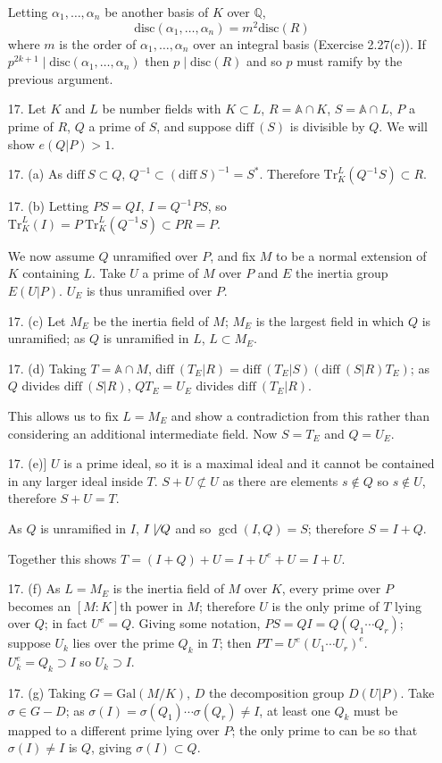 \documentclass{article}
\newcommand{\Q}[0]{\mathbb{Q}}
\newcommand{\diff}[1]{\text{diff}\ #1}
\newcommand{\disc}[1]{\text{disc}(#1)}
\newcommand{\gal}[2]{\text{Gal}(#1 / #2)}
\newcommand{\ringofintegers}[1]{\mathbb{A} \cap #1}
\begin{document}
\begin{enumerate}
Letting $\alpha_1, \ldots, \alpha_n$ be another basis of $K$ over $\Q$, \[ \disc{\alpha_1,\ldots,\alpha_n} = m^2 \disc{R} \] where $m$ is the order of $\alpha_1,\ldots,\alpha_n$ over an integral basis (Exercise 2.27(c)).  If $p^{2k + 1} \mid \disc{\alpha_1,\ldots,\alpha_n}$ then $p \mid \disc{R}$ and so $p$ must ramify by the previous argument.

\item [17.] Let $K$ and $L$ be number fields with $K \subset L$, $R = \ringofintegers{K}$, $S = \ringofintegers{L}$, $P$ a prime of $R$, $Q$ a prime of $S$, and suppose $\diff(S)$ is divisible by $Q$.  We will show $e(Q|P) > 1$.

\item [17. (a)] As $\diff{S} \subset Q$, $Q^{-1} \subset (\diff{S})^{-1} = S^{*}$.  Therefore $\text{Tr}^{L}_{K}(Q^{-1}S) \subset R$.
\item [17. (b)] Letting $PS = QI$, $I = Q^{-1}PS$, so $\text{Tr}^{L}_{K}(I) = P\ \text{Tr}^{L}_{K}(Q^{-1}S) \subset PR = P$.

We now assume $Q$ unramified over $P$, and fix $M$ to be a normal extension of $K$ containing $L$.  Take $U$ a prime of $M$ over $P$ and $E$ the inertia group $E(U|P)$.  $U_{E}$ is thus unramified over $P$.

\item [17. (c)] Let $M_{E}$ be the inertia field of $M$; $M_{E}$ is the largest field in which $Q$ is unramified; as $Q$ is unramified in $L$, $L \subset M_{E}$.
\item [17. (d)] Taking $T = \ringofintegers{M}$, $\diff(T_E|R) = \diff(T_E|S)(\diff(S|R)T_{E})$; as $Q$ divides $\diff(S|R)$, $QT_{E} = U_{E}$ divides $\diff(T_E|R)$.

This allows us to fix $L = M_{E}$ and show a contradiction from this rather than considering an additional intermediate field.  Now $S = T_{E}$ and $Q = U_{E}$.

\item [17.] (e)] $U$ is a prime ideal, so it is a maximal ideal and it cannot be contained in any larger ideal inside $T$.  $S + U \not\subset U$ as there are elements $s \not\in Q$ so $s \not\in U$, therefore $S + U = T$.

As $Q$ is unramified in $I$, $I \not\mid Q$ and so $\gcd(I, Q) = S$; therefore $S = I + Q$.

Together this shows $T = (I + Q) + U = I + U^{e} + U = I + U$.

\item[17. (f)] As $L = M_{E}$ is the inertia field of $M$ over $K$, every prime over $P$ becomes an $[M : K]$th power in $M$; therefore $U$ is the only prime of $T$ lying over $Q$; in fact $U^{e} = Q$.  Giving some notation, $PS = QI = Q(Q_1 \cdots Q_{r})$; suppose $U_k$ lies over the prime $Q_k$ in $T$; then $PT = U^{e}(U_1 \cdots U_{r})^{e}$.  $U_k^{e} = Q_k \supset I$ so $U_k \supset I$.
\item[17. (g)] Taking $G = \gal{M}{K}$, $D$ the decomposition group $D(U|P)$.  Take $\sigma \in G - D$; as $\sigma(I) = \sigma(Q_1)\cdots\sigma(Q_{r}) \neq I$, at least one $Q_{k}$ must be mapped to a different prime lying over $P$; the only prime to can be so that $\sigma(I) \neq I$ is $Q$, giving $\sigma(I) \subset Q$.


\end{enumerate}
\end{document}
